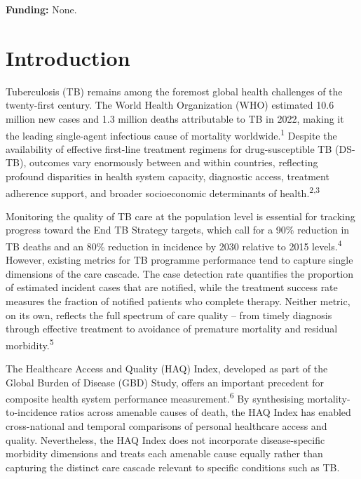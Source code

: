 \documentclass[12pt]{article}
\begin{document}
\textbf{Funding:} None.

\newpage


\section{Introduction}

Tuberculosis (TB) remains among the foremost global health challenges of the twenty-first century. The World Health Organization (WHO) estimated 10.6 million new cases and 1.3 million deaths attributable to TB in 2022, making it the leading single-agent infectious cause of mortality worldwide.\textsuperscript{1} Despite the availability of effective first-line treatment regimens for drug-susceptible TB (DS-TB), outcomes vary enormously between and within countries, reflecting profound disparities in health system capacity, diagnostic access, treatment adherence support, and broader socioeconomic determinants of health.\textsuperscript{2,3}

Monitoring the quality of TB care at the population level is essential for tracking progress toward the End TB Strategy targets, which call for a 90\% reduction in TB deaths and an 80\% reduction in incidence by 2030 relative to 2015 levels.\textsuperscript{4} However, existing metrics for TB programme performance tend to capture single dimensions of the care cascade. The case detection rate quantifies the proportion of estimated incident cases that are notified, while the treatment success rate measures the fraction of notified patients who complete therapy. Neither metric, on its own, reflects the full spectrum of care quality -- from timely diagnosis through effective treatment to avoidance of premature mortality and residual morbidity.\textsuperscript{5}

The Healthcare Access and Quality (HAQ) Index, developed as part of the Global Burden of Disease (GBD) Study, offers an important precedent for composite health system performance measurement.\textsuperscript{6} By synthesising mortality-to-incidence ratios across amenable causes of death, the HAQ Index has enabled cross-national and temporal comparisons of personal healthcare access and quality. Nevertheless, the HAQ Index does not incorporate disease-specific morbidity dimensions and treats each amenable cause equally rather than capturing the distinct care cascade relevant to specific conditions such as TB.
\end{document}
